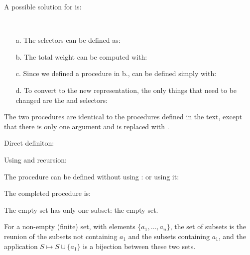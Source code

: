 \begin{exe}[2.28]
    A possible solution for  is:
\end{exe}

\begin{exe}[2.29]
    \ \vspace{-20pt}
    \begin{itemize}
        \item[a.] The selectors can be defined as:
        \item[b.] The total weight can be computed with:
        \item[c.] Since we defined a  procedure in b., 
             can be defined simply with:
        \item[d.] To convert to the new representation, the only things that 
            need to be changed are the  and 
             selectors:
    \end{itemize}
\end{exe}

\begin{exe}[2.30]
    The two  procedures are identical to the  
    procedures defined in the text, except that there is only one argument and 
     is replaced with .

    Direct definiton:

    Using  and recursion:
\end{exe}

\begin{exe}[2.31]
    The procedure  can be defined without using :
    or using it:
\end{exe}

\begin{exe}[2.32]
    The completed procedure is:

    The empty set has only one subset: the empty set.

    For a non-empty (finite) set, with elements $\{a_1, …, a_n\}$, the set of 
    subsets is the reunion of the subsets not containing $a_1$ and the subsets 
    containing $a_1$, and the application $S \mapsto S \cup \{a_1\}$ is 
    a bijection between these two sets.
\end{exe}


